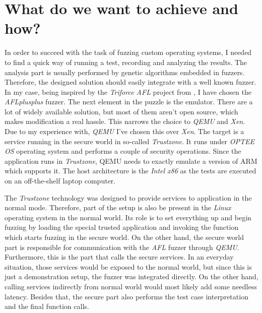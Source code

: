\cleardoublepage
\section{What do we want to achieve and how?} \label{chap:why}
In order to succeed with the task of fuzzing custom operating systems, I needed to find a quick way of running a test, recording and analyzing the results. The analysis part is usually performed by genetic algorithms embedded in fuzzers. Therefore, the designed solution should easily integrate with a well known fuzzer. In my case, being inspired by the \textit{Triforce AFL} project from \cite{triforceafl}, I have chosen the \textit{AFLplusplus} fuzzer. The next element in the puzzle is the emulator. There are a lot of widely available solution, but most of them aren't open source, which makes modification a real hassle. This narrows the choice to \textit{QEMU} and \textit{Xen}. Due to my experience with, \textit{QEMU} I've chosen this over \textit{Xen}. The target is a service running in the secure world in so-called \textit{Trustzone}. It runs under \textit{OPTEE OS} operating system and performs a couple of security operations. Since the application runs in \textit{Trustzone}, QEMU needs to exactly emulate a version of ARM which supports it. The host architecture is the \textit{Intel x86} as the tests are executed on an off-the-shelf laptop computer. 

The \textit{Trustzone} technology was designed to provide services to application in the normal mode. Therefore, part of the setup is also be present in the \textit{Linux} operating system in the normal world. Its role is to set everything up and begin fuzzing by loading the special trusted application and invoking the function which starts fuzzing in the secure world. On the other hand, the secure world part is responsible for communication with the \textit{AFL} fuzzer through \textit{QEMU}. Furthermore, this is the part that calls the secure services. In an everyday situation, those services would be exposed to the normal world, but since this is just a demonstration setup, the fuzzer was integrated directly. On the other hand, calling services indirectly from normal world would most likely add some needless latency. Besides that, the secure part also performs the test case interpretation and the final function calls. 

